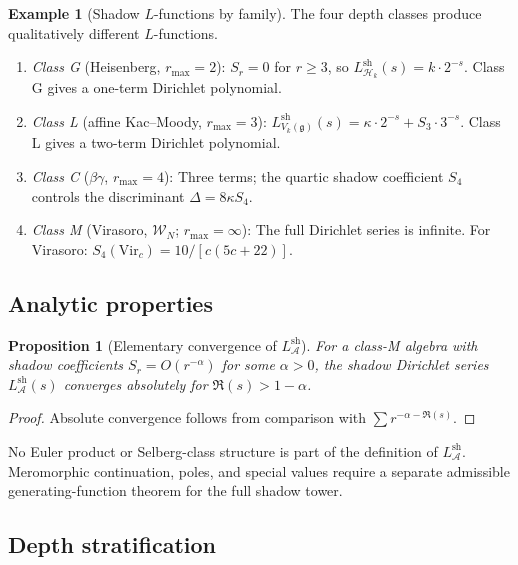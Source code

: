 \documentclass[11pt,reqno]{amsart}
\newtheorem{proposition}[theorem]{Proposition}
\theoremstyle{definition}
\newtheorem{example}[theorem]{Example}
\theoremstyle{remark}
\providecommand{\cA}{\mathcal{A}}
\providecommand{\cH}{\mathcal{H}}
\providecommand{\cW}{\mathcal{W}}
\providecommand{\fg}{\mathfrak{g}}
\providecommand{\Vir}{\mathrm{Vir}}
\providecommand{\sh}{\mathrm{sh}}
\numberwithin{equation}{section}
\begin{document}
\begin{example}[Shadow $L$-functions by family]
  \label{ex:shadow-L-families}
  The four depth classes produce qualitatively different
  $L$-functions.
  \begin{enumerate}[label=\textup{(\alph*)}]
  \item \emph{Class G} (Heisenberg, $r_{\max} = 2$):
    $S_r = 0$ for $r \ge 3$, so
    $L^{\sh}_{\cH_k}(s) = k \cdot 2^{-s}$.
    Class G gives a one-term Dirichlet polynomial.
  \item \emph{Class L} (affine Kac--Moody, $r_{\max} = 3$):
    $L^{\sh}_{V_k(\fg)}(s) = \kappa \cdot 2^{-s}
    + S_3 \cdot 3^{-s}$.
    Class L gives a two-term Dirichlet polynomial.
  \item \emph{Class C} ($\beta\gamma$, $r_{\max} = 4$):
    Three terms; the quartic shadow coefficient $S_4$ controls the
    discriminant $\Delta = 8\kappa S_4$.
  \item \emph{Class M} (Virasoro, $\cW_N$; $r_{\max} = \infty$):
    The full Dirichlet series is infinite.
    For Virasoro:
    $S_4(\Vir_c) = 10/[c(5c+22)]$.
  \end{enumerate}
\end{example}

\subsection{Analytic properties}

\begin{proposition}[Elementary convergence of
  $L^{\sh}_\cA$]\label{prop:shadow-L-analytic}
  For a class-M algebra with shadow coefficients
  $S_r = O(r^{-\alpha})$ for some $\alpha > 0$, the shadow
  Dirichlet series $L^{\sh}_\cA(s)$ converges absolutely for
  $\Re(s)>1-\alpha$.
\end{proposition}

\begin{proof}
  Absolute convergence follows from comparison with
  $\sum r^{-\alpha-\Re(s)}$.
\end{proof}

No Euler product or Selberg-class structure is part of the definition
of $L^{\sh}_\cA$. Meromorphic continuation, poles, and special values
require a separate admissible generating-function theorem for the
full shadow tower.

\subsection{Depth stratification}
\end{document}
